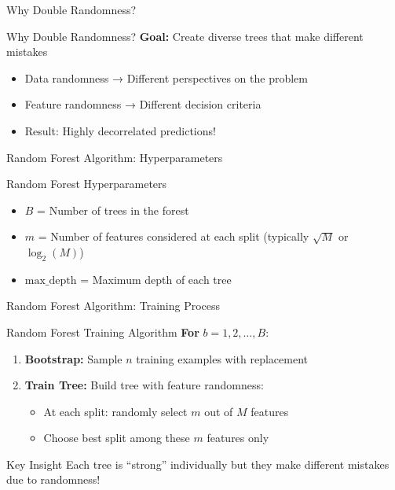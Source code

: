 \documentclass[10pt]{beamer}
\begin{document}
\begin{frame}{Why Double Randomness?}
\begin{examplebox}{Why Double Randomness?}
\textbf{Goal:} Create diverse trees that make different mistakes
\begin{itemize}
\item Data randomness → Different perspectives on the problem
\item Feature randomness → Different decision criteria
\item Result: Highly decorrelated predictions!
\end{itemize}
\end{examplebox}
\end{frame}

\begin{frame}{Random Forest Algorithm: Hyperparameters}
\begin{definitionbox}{Random Forest Hyperparameters}
\begin{itemize}
\item $B$ = Number of trees in the forest
\item $m$ = Number of features considered at each split (typically $\sqrt{M}$ or $\log_2(M)$)
\item $\text{max\_depth}$ = Maximum depth of each tree
\end{itemize}
\end{definitionbox}
\end{frame}

\begin{frame}{Random Forest Algorithm: Training Process}
\begin{alertbox}{Random Forest Training Algorithm}
\textbf{For } $b = 1, 2, \ldots, B$:
\begin{enumerate}
\item \textbf{Bootstrap:} Sample $n$ training examples with replacement
\item \textbf{Train Tree:} Build tree with feature randomness:
\begin{itemize}
\item At each split: randomly select $m$ out of $M$ features
\item Choose best split among these $m$ features only
\end{itemize}
\end{enumerate}
\end{alertbox}

\begin{keypointsbox}{Key Insight}
Each tree is ``strong'' individually but they make different mistakes due to randomness!
\end{keypointsbox}
\end{frame}
\end{document}
